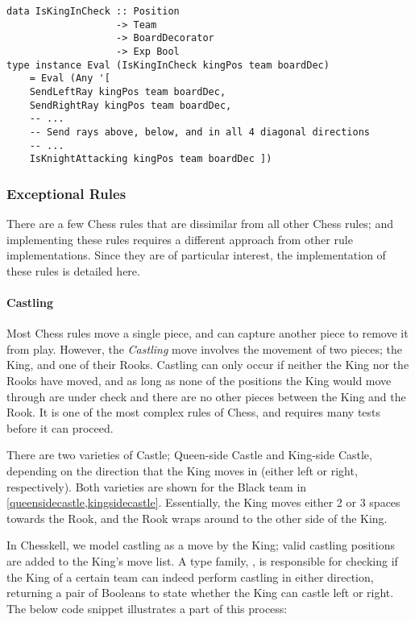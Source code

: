 \begin{lstlisting}
data IsKingInCheck :: Position
                   -> Team
                   -> BoardDecorator
                   -> Exp Bool
type instance Eval (IsKingInCheck kingPos team boardDec)
    = Eval (Any '[
    SendLeftRay kingPos team boardDec,
    SendRightRay kingPos team boardDec,
    -- ...
    -- Send rays above, below, and in all 4 diagonal directions
    -- ...
    IsKnightAttacking kingPos team boardDec ])
\end{lstlisting}

\subsubsection{Exceptional Rules}

There are a few Chess rules that are dissimilar from all other Chess rules; and implementing these rules requires a different approach from other rule implementations. Since they are of particular interest, the implementation of these rules is detailed here.

\paragraph{Castling} \label{castlesection}

Most Chess rules move a single piece, and can capture another piece to remove it from play. However, the \emph{Castling} move involves the movement of two pieces; the King, and one of their Rooks. Castling can only occur if neither the King nor the Rooks have moved, and as long as none of the positions the King would move through are under check and there are no other pieces between the King and the Rook. It is one of the most complex rules of Chess, and requires many tests before it can proceed.


There are two varieties of Castle; Queen-side Castle and King-side Castle, depending on the direction that the King moves in (either left or right, respectively). Both varieties are shown for the Black team in \cref{queensidecastle,kingsidecastle}. Essentially, the King moves either 2 or 3 spaces towards the Rook, and the Rook wraps around to the other side of the King.

In Chesskell, we model castling as a move by the King; valid castling positions are added to the King's move list. A type family, , is responsible for checking if the King of a certain team can indeed perform castling in either direction, returning a pair of Booleans to state whether the King can castle left or right. The below code snippet illustrates a part of this process:

